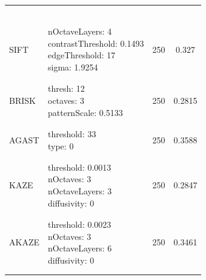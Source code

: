 \documentclass[journal]{IEEEtran}
\begin{document}
\begin{table}
{\begin{minipage}{0.47\textwidth}
\begin{tabular}{lp{3cm}cc}
    & & \\
    & & \\
    & & \\
    & & \\
    & & \\
    & & \\
    \multirow{4}{*}{SIFT} & \multirow{4}{*}{\parbox{3cm}{\raggedright nOctaveLayers: 4\\contrastThreshold: 0.1493\\edgeThreshold: 17\\sigma: 1.9254}} & \multirow{4}{*}{250}  & \multirow{4}{*}{0.327} \\
    & & \\
    & & \\
    & & \\
    & & \\
    & & \\
    \multirow{3}{*}{BRISK} & \multirow{3}{*}{\parbox{3cm}{\raggedright thresh: 12\\octaves: 3\\patternScale: 0.5133}} & \multirow{3}{*}{250}  & \multirow{3}{*}{0.2815} \\
    & & \\
    & & \\
    & & \\
    & & \\
    \multirow{2}{*}{AGAST} & \multirow{2}{*}{\parbox{3cm}{\raggedright threshold: 33\\type: 0}} & \multirow{2}{*}{250}  & \multirow{2}{*}{0.3588} \\
    & & \\
    & & \\
    & & \\
    \multirow{4}{*}{KAZE} & \multirow{4}{*}{\parbox{3cm}{\raggedright threshold: 0.0013\\nOctaves: 3\\nOctaveLayers: 3\\diffusivity: 0}} & \multirow{4}{*}{250}  & \multirow{4}{*}{0.2847} \\
    & & \\
    & & \\
    & & \\
    & & \\
    & & \\
    \multirow{4}{*}{AKAZE} & \multirow{4}{*}{\parbox{3cm}{\raggedright threshold: 0.0023\\nOctaves: 3\\nOctaveLayers: 6\\diffusivity: 0}} & \multirow{4}{*}{250}  & \multirow{4}{*}{0.3461} \\
    & & \\
    & & \\
    & & \\
    & & \\
    & & \\
    \bottomrule
    \end{tabular}
\end{minipage}
}
\end{table}
\end{document}
